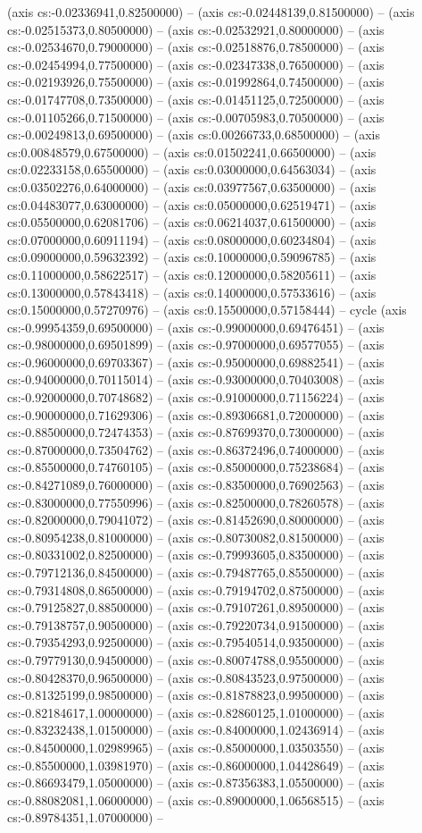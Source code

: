 (axis cs:-0.02336941,0.82500000) -- (axis cs:-0.02448139,0.81500000) -- (axis cs:-0.02515373,0.80500000) -- (axis cs:-0.02532921,0.80000000) -- (axis cs:-0.02534670,0.79000000) -- (axis cs:-0.02518876,0.78500000) -- (axis cs:-0.02454994,0.77500000) -- (axis cs:-0.02347338,0.76500000) -- (axis cs:-0.02193926,0.75500000) -- (axis cs:-0.01992864,0.74500000) -- (axis cs:-0.01747708,0.73500000) -- (axis cs:-0.01451125,0.72500000) -- (axis cs:-0.01105266,0.71500000) -- (axis cs:-0.00705983,0.70500000) -- (axis cs:-0.00249813,0.69500000) -- (axis cs:0.00266733,0.68500000) -- (axis cs:0.00848579,0.67500000) -- (axis cs:0.01502241,0.66500000) -- (axis cs:0.02233158,0.65500000) -- (axis cs:0.03000000,0.64563034) -- (axis cs:0.03502276,0.64000000) -- (axis cs:0.03977567,0.63500000) -- (axis cs:0.04483077,0.63000000) -- (axis cs:0.05000000,0.62519471) -- (axis cs:0.05500000,0.62081706) -- (axis cs:0.06214037,0.61500000) -- (axis cs:0.07000000,0.60911194) -- (axis cs:0.08000000,0.60234804) -- (axis cs:0.09000000,0.59632392) -- (axis cs:0.10000000,0.59096785) -- (axis cs:0.11000000,0.58622517) -- (axis cs:0.12000000,0.58205611) -- (axis cs:0.13000000,0.57843418) -- (axis cs:0.14000000,0.57533616) -- (axis cs:0.15000000,0.57270976) -- (axis cs:0.15500000,0.57158444) -- cycle (axis cs:-0.99954359,0.69500000) -- (axis cs:-0.99000000,0.69476451) -- (axis cs:-0.98000000,0.69501899) -- (axis cs:-0.97000000,0.69577055) -- (axis cs:-0.96000000,0.69703367) -- (axis cs:-0.95000000,0.69882541) -- (axis cs:-0.94000000,0.70115014) -- (axis cs:-0.93000000,0.70403008) -- (axis cs:-0.92000000,0.70748682) -- (axis cs:-0.91000000,0.71156224) -- (axis cs:-0.90000000,0.71629306) -- (axis cs:-0.89306681,0.72000000) -- (axis cs:-0.88500000,0.72474353) -- (axis cs:-0.87699370,0.73000000) -- (axis cs:-0.87000000,0.73504762) -- (axis cs:-0.86372496,0.74000000) -- (axis cs:-0.85500000,0.74760105) -- (axis cs:-0.85000000,0.75238684) -- (axis cs:-0.84271089,0.76000000) -- (axis cs:-0.83500000,0.76902563) -- (axis cs:-0.83000000,0.77550996) -- (axis cs:-0.82500000,0.78260578) -- (axis cs:-0.82000000,0.79041072) -- (axis cs:-0.81452690,0.80000000) -- (axis cs:-0.80954238,0.81000000) -- (axis cs:-0.80730082,0.81500000) -- (axis cs:-0.80331002,0.82500000) -- (axis cs:-0.79993605,0.83500000) -- (axis cs:-0.79712136,0.84500000) -- (axis cs:-0.79487765,0.85500000) -- (axis cs:-0.79314808,0.86500000) -- (axis cs:-0.79194702,0.87500000) -- (axis cs:-0.79125827,0.88500000) -- (axis cs:-0.79107261,0.89500000) -- (axis cs:-0.79138757,0.90500000) -- (axis cs:-0.79220734,0.91500000) -- (axis cs:-0.79354293,0.92500000) -- (axis cs:-0.79540514,0.93500000) -- (axis cs:-0.79779130,0.94500000) -- (axis cs:-0.80074788,0.95500000) -- (axis cs:-0.80428370,0.96500000) -- (axis cs:-0.80843523,0.97500000) -- (axis cs:-0.81325199,0.98500000) -- (axis cs:-0.81878823,0.99500000) -- (axis cs:-0.82184617,1.00000000) -- (axis cs:-0.82860125,1.01000000) -- (axis cs:-0.83232438,1.01500000) -- (axis cs:-0.84000000,1.02436914) -- (axis cs:-0.84500000,1.02989965) -- (axis cs:-0.85000000,1.03503550) -- (axis cs:-0.85500000,1.03981970) -- (axis cs:-0.86000000,1.04428649) -- (axis cs:-0.86693479,1.05000000) -- (axis cs:-0.87356383,1.05500000) -- (axis cs:-0.88082081,1.06000000) -- (axis cs:-0.89000000,1.06568515) -- (axis cs:-0.89784351,1.07000000) -- 